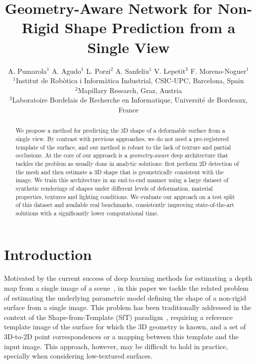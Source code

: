 \documentclass[10pt,twocolumn,letterpaper]{article}
\begin{document}
\title{{Geometry-Aware Network for Non-Rigid Shape Prediction from a Single View}}

\author{A. Pumarola$^{1}$ \hspace{0.7cm}
A.  Agudo$^{1}$ \hspace{0.7cm}
L.  Porzi$^{2}$ \hspace{0.7cm}
A.  Sanfeliu$^{1}$ \hspace{0.7cm}
V.  Lepetit$^{3}$ \hspace{0.7cm}
F.  Moreno-Noguer$^{1}$ \\
$^{1}$Institut de Rob\`otica i Inform\`atica Industrial, CSIC-UPC, Barcelona, Spain\\
$^{2}$Mapillary Research, Graz, Austria\\
$^{3}$Laboratoire Bordelais de
Recherche en Informatique, Universit\'e de Bordeaux, France
}

\maketitle

\begin{abstract}


We propose a method for predicting the 3D shape of a deformable surface from a single view. By contrast with previous approaches, we do not need a pre-registered template of the surface, and our method is robust to the lack of texture and partial occlusions. At the core of our approach is a {\it geometry-aware} deep architecture that tackles the problem as usually done in analytic solutions: first perform 2D detection of the mesh and then estimate a 3D shape that is geometrically consistent with the image. We train this architecture in an end-to-end manner using a large dataset of synthetic renderings of shapes under different levels of deformation, material properties, textures and lighting conditions. We evaluate our approach on a test split of this dataset and available real benchmarks, consistently improving state-of-the-art solutions with a significantly lower computational time. 

\end{abstract}

\section{Introduction}




Motivated by the current success of deep learning methods for estimating a depth map from a single image of a scene~\cite{eigen2014depth, garg2016unsupervised,GodardCVPR2017}, in this paper we tackle the related problem of estimating the underlying parametric model defining the shape of a non-rigid surface from a single image. This problem has been traditionally addressed in the context of the Shape-from-Template (SfT) paradigm~\cite{bartoli2015shape}, requiring a reference template image of the surface for which the 3D geometry is known, and a set of 3D-to-2D point correspondences or a mapping between this template and the input image. This approach, however, may be difficult to hold in practice, specially when considering low-textured surfaces. 
\end{document}
